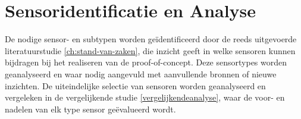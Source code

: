 
\section{Sensoridentificatie en Analyse} \label{sensoridentificatie}
De nodige sensor- en subtypen worden geïdentificeerd door de reeds uitgevoerde literatuurstudie \ref{ch:stand-van-zaken}, die inzicht geeft in welke sensoren kunnen bijdragen bij het realiseren van de proof-of-concept. Deze sensortypes worden geanalyseerd en waar nodig aangevuld met aanvullende bronnen of nieuwe inzichten. De uiteindelijke selectie van sensoren worden geanalyseerd en vergeleken in de vergelijkende studie \ref{vergelijkendeanalyse}, waar de voor- en nadelen van elk type sensor geëvalueerd wordt.


